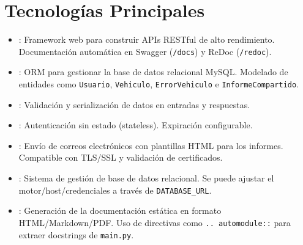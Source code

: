 \documentclass[a4paper,11pt,spanish]{sphinxmanual}
\newcommand{\robotoMonoBold}{\fontseries{b}\selectfont\ttfamily}
\renewcommand{\sphinxcode}[1]{\textcolor{sphinxorangeCode}{{\robotoMonoBold #1}}}
\renewcommand{\sphinxupquote}[1]{\texttt{#1}}
\begin{document}
\section{Tecnologías Principales}
\label{\detokenize{introduccion:tecnologias-principales}}\begin{itemize}
\item {} 
\sphinxAtStartPar
{}:
\sphinxhyphen{} Framework web para construir APIs RESTful de alto rendimiento.
\sphinxhyphen{} Documentación automática en Swagger (\sphinxcode{\sphinxupquote{/docs}}) y ReDoc (\sphinxcode{\sphinxupquote{/redoc}}).

\item {} 
\sphinxAtStartPar
{}:
\sphinxhyphen{} ORM para gestionar la base de datos relacional MySQL.
\sphinxhyphen{} Modelado de entidades como \sphinxcode{\sphinxupquote{Usuario}}, \sphinxcode{\sphinxupquote{Vehiculo}}, \sphinxcode{\sphinxupquote{ErrorVehiculo}} e \sphinxcode{\sphinxupquote{InformeCompartido}}.

\item {} 
\sphinxAtStartPar
{}:
\sphinxhyphen{} Validación y serialización de datos en entradas y respuestas.

\item {} 
\sphinxAtStartPar
{}:
\sphinxhyphen{} Autenticación sin estado (stateless).
\sphinxhyphen{} Expiración configurable.

\item {} 
\sphinxAtStartPar
{}:
\sphinxhyphen{} Envío de correos electrónicos con plantillas HTML para los informes.
\sphinxhyphen{} Compatible con TLS/SSL y validación de certificados.

\item {} 
\sphinxAtStartPar
{}:
\sphinxhyphen{} Sistema de gestión de base de datos relacional.
\sphinxhyphen{} Se puede ajustar el motor/host/credenciales a través de \sphinxcode{\sphinxupquote{DATABASE\_URL}}.

\item {} 
\sphinxAtStartPar
{}:
\sphinxhyphen{} Generación de la documentación estática en formato HTML/Markdown/PDF.
\sphinxhyphen{} Uso de directivas como \sphinxcode{\sphinxupquote{.. automodule::}} para extraer docstrings de \sphinxcode{\sphinxupquote{main.py}}.

\end{itemize}
\end{document}
